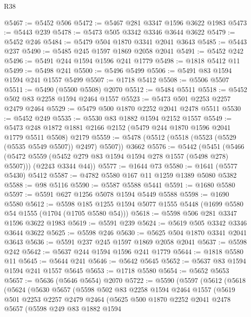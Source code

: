 \begin{lexlean}{R38}
\begin{coremodule}
@5467 := @5452 @506
@5472 := @5467 @281 @3347 @1596 @3622 @1983
@5473 := @5443 @239
@5478 := @5473 @505 @3342 @3346 @3644 @3622
@5479 := @5452 @246
@5484 := @5479 @504 @1870 @3341 @2041 @3643
@5485 := @5443 @237
@5490 := @5485 @245 @1597 @1869 @2058 @2041
@5491 := @5452 @242
@5496 := @5491 @244 @1594 @1596 @241 @1779
@5498 := @1818 @5412 @11
@5499 := @5498 @241
@5500 := @5496 @5499
@5506 := @5491 @83 @1594 @1594 @241 @1557 @5499
@5507 := @1718 @5412
@5508 := @5506 @5507
@5511 := @5490 (@5500 @5508) @2070
@5512 := @5484 @5511
@5518 := @5452 @502 @83 @2258 @1594 @2464 @1557
@5523 := @5473 @501 @2253 @2257 @2479 @2464
@5529 := @5479 @500 @1870 @2252 @2041 @2478 @5511
@5530 := @5452 @249
@5535 := @5530 @83 @1882 @1594 @2152 @1557
@5549 := @5473 @248 @1872 @1881 @2166 @2152 (@5479 @244 @1870 @1596 @2041 @1779 @5511 @5508) @2179
@5559 := @5478 (@5512 (@5518 (@5523 (@5529 (@5535 @5549 @5507)) @2497) @5507)) @3662
@5576 := @5442
    (@5451
      (@5466 (@5472 @5559 (@5452 @279 @83 @1594 @1594 @278 @1557 (@5498 @278) @5507)))
      (@2243 @3344 @44))
@5577 := @1644 @73
@5580 := @1641 (@5577 @5430) @5412
@5587 := @4782 @5580 @167 @11 @1259 @1389 @5080 @5382
@5588 := @98 @5116
@5590 := @5587 @5588 @5441
@5591 := @1680 @5580
@5597 := @5591 @627 @1256 @5078 @1594 @5449 @5588
@5598 := @1690 @5580
@5612 := @5598 @185 @1255 @1594 @5077 @1555 @5448 (@1699 @5580 @54 @1555 (@1704 (@1705 @5580 @54)))
@5618 := @5598 @506 @281 @3347 @1596 @3622 @1983
@5619 := @5591 @239
@5624 := @5619 @505 @3342 @3346 @3644 @3622
@5625 := @5598 @246
@5630 := @5625 @504 @1870 @3341 @2041 @3643
@5636 := @5591 @237 @245 @1597 @1869 @2058 @2041
@5637 := @5598 @242
@5642 := @5637 @244 @1594 @1596 @241 @1779
@5644 := @1818 @5580 @11
@5645 := @5644 @241
@5646 := @5642 @5645
@5652 := @5637 @83 @1594 @1594 @241 @1557 @5645
@5653 := @1718 @5580
@5654 := @5652 @5653
@5657 := @5636 (@5646 @5654) @2070
@5722 := @5590
    (@5597
      (@5612
        (@5618
          (@5624
            (@5630
              @5657
              (@5598
                @502
                @83
                @2258
                @1594
                @2464
                @1557
                (@5619
                  @501
                  @2253
                  @2257
                  @2479
                  @2464
                  (@5625
                    @500
                    @1870
                    @2252
                    @2041
                    @2478
                    @5657
                    (@5598
                      @249
                      @83
                      @1882
                      @1594

\end{coremodule}
\end{lexlean}
